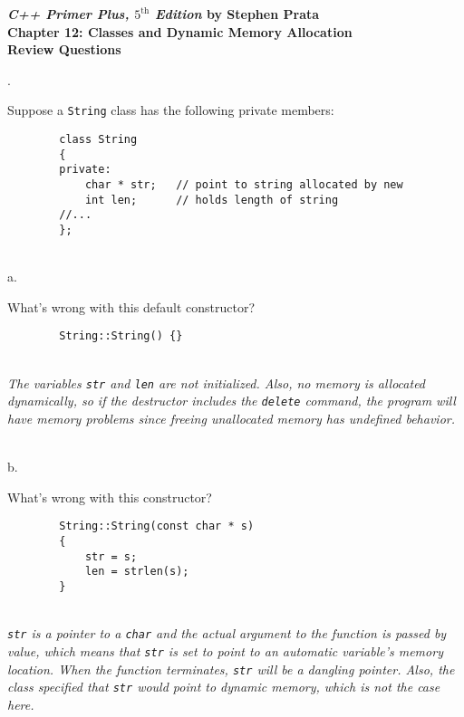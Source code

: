 \documentclass{amsart}
\begin{document}
\begin{center}
	\Large {\bfseries
	\emph{C++ Primer Plus, $5^{\text{th}}$ Edition} by Stephen Prata \\
	Chapter 12: Classes and Dynamic Memory Allocation \\
	Review Questions} \normalsize \vspace{5ex}
\end{center}


\vfill
{}. 
\begin{minipage}[t]{11.5 cm}
	Suppose a \texttt{String} class has the following private members:
	\begin{verbatim}
		class String
		{
		private:
		    char * str;   // point to string allocated by new
		    int len;      // holds length of string
		//...
		};
	\end{verbatim}
\end{minipage} \\[1ex]
\phantom{1. }a.
\begin{minipage}[t]{11.5 cm}
	What's wrong with this default constructor?
	\begin{verbatim}
		String::String() {}
	\end{verbatim}
	\\[1ex]
	{\slshape 
		The variables \verb+str+ and \verb+len+ are not initialized.
		Also, no memory is allocated dynamically, so if the destructor
		includes the \verb+delete+ command, the program will have
		memory problems since freeing unallocated memory has
		undefined behavior.
	} \\
	{} %
\end{minipage} \\[1ex]
\phantom{1. }b.
\begin{minipage}[t]{11.5 cm}
	What's wrong with this constructor?
	\begin{verbatim}
		String::String(const char * s)
		{
		    str = s;
		    len = strlen(s);
		}
	\end{verbatim}
	\\[1ex]
	{\slshape 
		\verb+str+ is a pointer to a \verb+char+ and the actual
		argument to the function is passed by value, which means
		that \verb+str+ is set to point to an automatic variable's
		memory location.
		When the function terminates, \verb+str+ will be a dangling
		pointer.
		Also, the class specified that \verb+str+ would point to
		dynamic memory, which is not the case here.
	}\\
	{} %
\end{minipage} \\[1ex]
\end{document}
